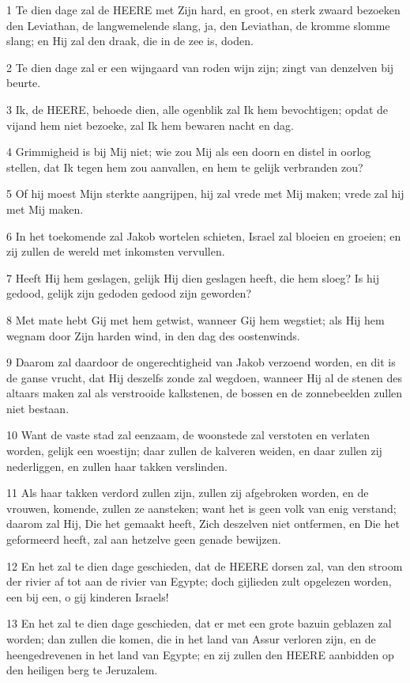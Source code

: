 \par 1 Te dien dage zal de HEERE met Zijn hard, en groot, en sterk zwaard bezoeken den Leviathan, de langwemelende slang, ja, den Leviathan, de kromme slomme slang; en Hij zal den draak, die in de zee is, doden.
\par 2 Te dien dage zal er een wijngaard van roden wijn zijn; zingt van denzelven bij beurte.
\par 3 Ik, de HEERE, behoede dien, alle ogenblik zal Ik hem bevochtigen; opdat de vijand hem niet bezoeke, zal Ik hem bewaren nacht en dag.
\par 4 Grimmigheid is bij Mij niet; wie zou Mij als een doorn en distel in oorlog stellen, dat Ik tegen hem zou aanvallen, en hem te gelijk verbranden zou?
\par 5 Of hij moest Mijn sterkte aangrijpen, hij zal vrede met Mij maken; vrede zal hij met Mij maken.
\par 6 In het toekomende zal Jakob wortelen schieten, Israel zal bloeien en groeien; en zij zullen de wereld met inkomsten vervullen.
\par 7 Heeft Hij hem geslagen, gelijk Hij dien geslagen heeft, die hem sloeg? Is hij gedood, gelijk zijn gedoden gedood zijn geworden?
\par 8 Met mate hebt Gij met hem getwist, wanneer Gij hem wegstiet; als Hij hem wegnam door Zijn harden wind, in den dag des oostenwinds.
\par 9 Daarom zal daardoor de ongerechtigheid van Jakob verzoend worden, en dit is de ganse vrucht, dat Hij deszelfs zonde zal wegdoen, wanneer Hij al de stenen des altaars maken zal als verstrooide kalkstenen, de bossen en de zonnebeelden zullen niet bestaan.
\par 10 Want de vaste stad zal eenzaam, de woonstede zal verstoten en verlaten worden, gelijk een woestijn; daar zullen de kalveren weiden, en daar zullen zij nederliggen, en zullen haar takken verslinden.
\par 11 Als haar takken verdord zullen zijn, zullen zij afgebroken worden, en de vrouwen, komende, zullen ze aansteken; want het is geen volk van enig verstand; daarom zal Hij, Die het gemaakt heeft, Zich deszelven niet ontfermen, en Die het geformeerd heeft, zal aan hetzelve geen genade bewijzen.
\par 12 En het zal te dien dage geschieden, dat de HEERE dorsen zal, van den stroom der rivier af tot aan de rivier van Egypte; doch gijlieden zult opgelezen worden, een bij een, o gij kinderen Israels!
\par 13 En het zal te dien dage geschieden, dat er met een grote bazuin geblazen zal worden; dan zullen die komen, die in het land van Assur verloren zijn, en de heengedrevenen in het land van Egypte; en zij zullen den HEERE aanbidden op den heiligen berg te Jeruzalem.

